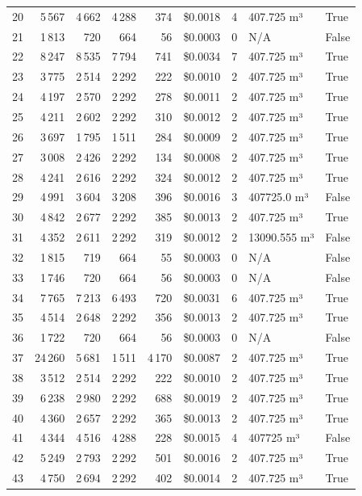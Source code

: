 \documentclass[a4paper,11pt]{article}
\begin{document}
\begin{table}[ht]
\begin{tabular}{r r r r r r r p{3cm} l}
20 & 5\,567 & 4\,662 & 4\,288 & 374 & \$0.0018 & 4 & 407.725 m³ & True \\
21 & 1\,813 & 720 & 664 & 56 & \$0.0003 & 0 & N/A & False \\
22 & 8\,247 & 8\,535 & 7\,794 & 741 & \$0.0034 & 7 & 407.725 m³ & True \\
23 & 3\,775 & 2\,514 & 2\,292 & 222 & \$0.0010 & 2 & 407.725 m³ & True \\
24 & 4\,197 & 2\,570 & 2\,292 & 278 & \$0.0011 & 2 & 407.725 m³ & True \\
25 & 4\,211 & 2\,602 & 2\,292 & 310 & \$0.0012 & 2 & 407.725 m³ & True \\
26 & 3\,697 & 1\,795 & 1\,511 & 284 & \$0.0009 & 2 & 407.725 m³ & True \\
27 & 3\,008 & 2\,426 & 2\,292 & 134 & \$0.0008 & 2 & 407.725 m³ & True \\
28 & 4\,241 & 2\,616 & 2\,292 & 324 & \$0.0012 & 2 & 407.725 m³ & True \\
29 & 4\,991 & 3\,604 & 3\,208 & 396 & \$0.0016 & 3 & 407725.0 m³ & False \\
30 & 4\,842 & 2\,677 & 2\,292 & 385 & \$0.0013 & 2 & 407.725 m³ & True \\
31 & 4\,352 & 2\,611 & 2\,292 & 319 & \$0.0012 & 2 & 13090.555 m³ & False \\
32 & 1\,815 & 719 & 664 & 55 & \$0.0003 & 0 & N/A & False \\
33 & 1\,746 & 720 & 664 & 56 & \$0.0003 & 0 & N/A & False \\
34 & 7\,765 & 7\,213 & 6\,493 & 720 & \$0.0031 & 6 & 407.725 m³ & True \\
35 & 4\,514 & 2\,648 & 2\,292 & 356 & \$0.0013 & 2 & 407.725 m³ & True \\
36 & 1\,722 & 720 & 664 & 56 & \$0.0003 & 0 & N/A & False \\
37 & 24\,260 & 5\,681 & 1\,511 & 4\,170 & \$0.0087 & 2 & 407.725 m³ & True \\
38 & 3\,512 & 2\,514 & 2\,292 & 222 & \$0.0010 & 2 & 407.725 m³ & True \\
39 & 6\,238 & 2\,980 & 2\,292 & 688 & \$0.0019 & 2 & 407.725 m³ & True \\
40 & 4\,360 & 2\,657 & 2\,292 & 365 & \$0.0013 & 2 & 407.725 m³ & True \\
41 & 4\,344 & 4\,516 & 4\,288 & 228 & \$0.0015 & 4 & 407725 m³ & False \\
42 & 5\,249 & 2\,793 & 2\,292 & 501 & \$0.0016 & 2 & 407.725 m³ & True \\
43 & 4\,750 & 2\,694 & 2\,292 & 402 & \$0.0014 & 2 & 407.725 m³ & True \\

\end{tabular}
\end{table}
\end{document}
